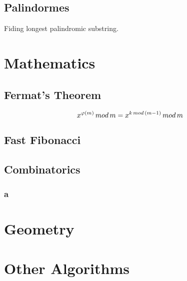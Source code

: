 \documentclass[13pt]{article}
\begin{document}



\subsection{Palindormes}\label{sub:pal} %
Fiding longest palindromic substring.


\section{Mathematics}

\subsection{Fermat's Theorem}\label{sub:fermat_s_theorem} %
\[
	\Huge	x^{\varphi(m)}\,mod\,m = x^{k\,mod\,(m-1)}\,mod\,m
\]


\subsection{Fast Fibonacci}\label{sub:fast_fibonacci} %


\subsection{Combinatorics}\label{sub:combinatorics} %

\subsubsection{a}\label{ssub:a} %



\section{Geometry}

\section{Other Algorithms}


\end{document}
